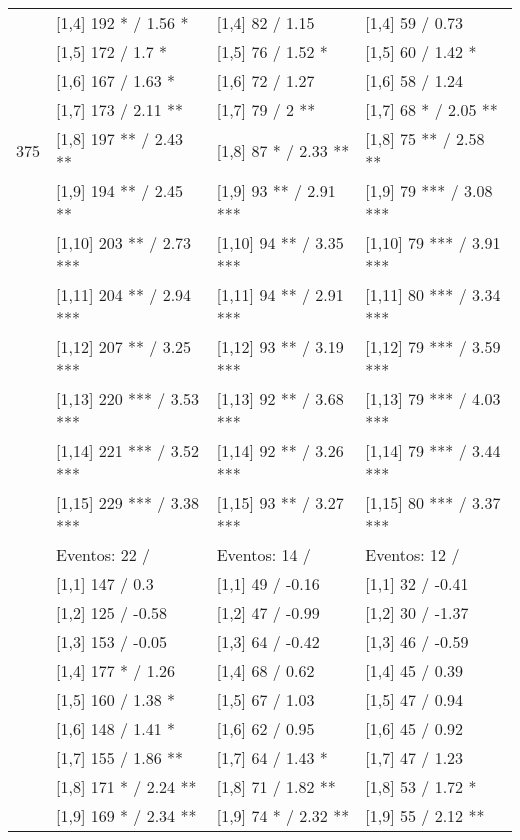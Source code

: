 \begin{table}
\begin{tabular}[t]{llll}
\addlinespace
 & {}[1,4] 192 * / 1.56 * & {}[1,4] 82  / 1.15 & {}[1,4] 59  / 0.73\\
 & {}[1,5] 172  / 1.7 * & {}[1,5] 76  / 1.52 * & {}[1,5] 60  / 1.42 *\\
 & {}[1,6] 167  / 1.63 * & {}[1,6] 72  / 1.27 & {}[1,6] 58  / 1.24\\
 & {}[1,7] 173  / 2.11 ** & {}[1,7] 79  / 2 ** & {}[1,7] 68 * / 2.05 **\\
375 & {}[1,8] 197 ** / 2.43 ** & {}[1,8] 87 * / 2.33 ** & {}[1,8] 75 ** / 2.58 **\\
\addlinespace
 & {}[1,9] 194 ** / 2.45 ** & {}[1,9] 93 ** / 2.91 *** & {}[1,9] 79 *** / 3.08 ***\\
 & {}[1,10] 203 ** / 2.73 *** & {}[1,10] 94 ** / 3.35 *** & {}[1,10] 79 *** / 3.91 ***\\
 & {}[1,11] 204 ** / 2.94 *** & {}[1,11] 94 ** / 2.91 *** & {}[1,11] 80 *** / 3.34 ***\\
 & {}[1,12] 207 ** / 3.25 *** & {}[1,12] 93 ** / 3.19 *** & {}[1,12] 79 *** / 3.59 ***\\
 & {}[1,13] 220 *** / 3.53 *** & {}[1,13] 92 ** / 3.68 *** & {}[1,13] 79 *** / 4.03 ***\\
\addlinespace
 & {}[1,14] 221 *** / 3.52 *** & {}[1,14] 92 ** / 3.26 *** & {}[1,14] 79 *** / 3.44 ***\\
 & {}[1,15] 229 *** / 3.38 *** & {}[1,15] 93 ** / 3.27 *** & {}[1,15] 80 *** / 3.37 ***\\
 & Eventos:  22 / & Eventos:  14 / & Eventos:  12 /\\
 & {}[1,1] 147  / 0.3 & {}[1,1] 49  / -0.16 & {}[1,1] 32  / -0.41\\
 & {}[1,2] 125  / -0.58 & {}[1,2] 47  / -0.99 & {}[1,2] 30  / -1.37\\
\addlinespace
 & {}[1,3] 153  / -0.05 & {}[1,3] 64  / -0.42 & {}[1,3] 46  / -0.59\\
 & {}[1,4] 177 * / 1.26 & {}[1,4] 68  / 0.62 & {}[1,4] 45  / 0.39\\
 & {}[1,5] 160  / 1.38 * & {}[1,5] 67  / 1.03 & {}[1,5] 47  / 0.94\\
 & {}[1,6] 148  / 1.41 * & {}[1,6] 62  / 0.95 & {}[1,6] 45  / 0.92\\
 & {}[1,7] 155  / 1.86 ** & {}[1,7] 64  / 1.43 * & {}[1,7] 47  / 1.23\\
\addlinespace
500 & {}[1,8] 171 * / 2.24 ** & {}[1,8] 71  / 1.82 ** & {}[1,8] 53  / 1.72 *\\
 & {}[1,9] 169 * / 2.34 ** & {}[1,9] 74 * / 2.32 ** & {}[1,9] 55  / 2.12 **\\

\end{tabular}
\end{table}
